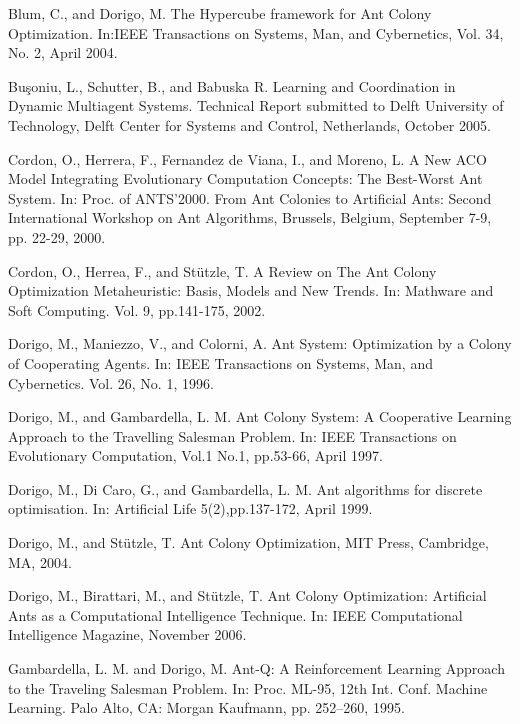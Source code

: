 %
%
\newpage
\begin{thebibliography}{9}
Blum,  C.,  and  Dorigo,  M.  The  Hypercube  framework  for  Ant  Colony  Optimization. In:IEEE Transactions on Systems, Man, and Cybernetics, Vol. 34, No. 2, April 2004. 
 
Buşoniu,  L.,  Schutter,  B.,  and  Babuska  R.  Learning  and  Coordination  in  Dynamic Multiagent  Systems.  Technical  Report  submitted  to  Delft  University  of  Technology,  Delft Center for Systems and Control, Netherlands, October 2005. 

Cordon,  O.,  Herrera,  F.,  Fernandez  de  Viana,  I.,  and  Moreno,  L.  A  New  ACO  Model Integrating Evolutionary Computation Concepts: The Best-Worst Ant System. In:  Proc. of ANTS’2000.  From  Ant  Colonies  to  Artificial  Ants:  Second  International  Workshop  on  Ant Algorithms, Brussels, Belgium, September 7-9, pp. 22-29, 2000.

Cordon,  O.,  Herrea,  F.,  and  Stützle,  T.  A  Review  on  The  Ant  Colony  Optimization Metaheuristic:  Basis,  Models  and  New  Trends.  In: Mathware  and  Soft  Computing.  Vol.  9, pp.141-175, 2002.

Dorigo,  M.,  Maniezzo,  V.,  and  Colorni,  A.  Ant  System:  Optimization  by  a  Colony  of Cooperating Agents. In: IEEE Transactions on Systems, Man, and Cybernetics. Vol. 26, No. 1, 1996.

Dorigo,  M.,  and  Gambardella,  L.  M.  Ant  Colony  System:  A  Cooperative  Learning Approach  to  the  Travelling  Salesman  Problem.  In: IEEE  Transactions  on  Evolutionary Computation, Vol.1 No.1, pp.53-66, April 1997.

Dorigo, M., Di Caro, G., and Gambardella, L. M. Ant algorithms for discrete optimisation. In: Artificial Life 5(2),pp.137-172, April 1999. 

Dorigo, M., and Stützle, T. Ant Colony Optimization, MIT Press, Cambridge, MA, 2004.

Dorigo,  M.,  Birattari,  M.,  and  Stützle,  T.  Ant Colony  Optimization:  Artificial  Ants  as  a Computational   Intelligence   Technique.  In: IEEE  Computational  Intelligence  Magazine, November 2006.

Gambardella, L. M. and Dorigo, M. Ant-Q: A Reinforcement Learning Approach to the Traveling Salesman Problem. In: Proc. ML-95, 12th Int. Conf. Machine Learning. Palo Alto, CA: Morgan Kaufmann, pp. 252–260, 1995.


\end{thebibliography}
